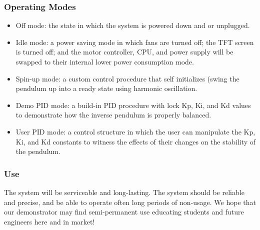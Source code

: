 \documentclass[aspectratio=169]{beamer}
\begin{document}
\begin{frame}
    \frametitle{Operating Modes}

    \begin{itemize}
        \item Off mode: the state in which the system is powered down and or unplugged.
        \item Idle mode: a power saving mode in which fans are turned off; the TFT screen is turned off; and the motor controller, CPU, and power supply will be swapped to their internal lower power consumption mode. 
        \item Spin-up mode: a custom control procedure that self initializes (swing the pendulum up into a ready state using harmonic oscillation.
        \item Demo PID mode: a build-in PID procedure with lock Kp, Ki, and Kd values to demonstrate how the inverse pendulum is properly balanced. 
        \item User PID mode: a control structure in which the user can manipulate the Kp, Ki, and Kd constants to witness the effects of their changes on the stability of the pendulum. 
    \end{itemize}

\end{frame}


\begin{frame}
    \frametitle{Use}
    The system will be serviceable and long-lasting. The system should be reliable and precise, and be able to operate often long periods of non-usage.
    \vspace{.5cm}
    We hope that our demonstrator may find semi-permanent use educating students and future
    engineers here and in market!

\end{frame}
\end{document}
